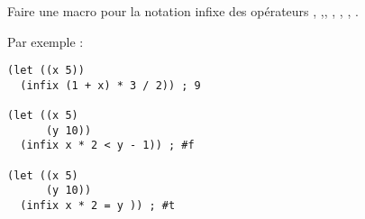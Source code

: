 \begin{Exercise}[title={Macro infixe}]
Faire une macro pour la notation infixe des opérateurs \codeinline{+},
\codeinline{-},\codeinline{*}, \codeinline{/}, \codeinline{>},
\codeinline{<}, \codeinline{=}.

Par exemple :
\begin{verbatim}
(let ((x 5))
  (infix (1 + x) * 3 / 2)) ; 9

(let ((x 5)
      (y 10))
  (infix x * 2 < y - 1)) ; #f

(let ((x 5)
      (y 10))
  (infix x * 2 = y )) ; #t
\end{verbatim}
\end{Exercise}